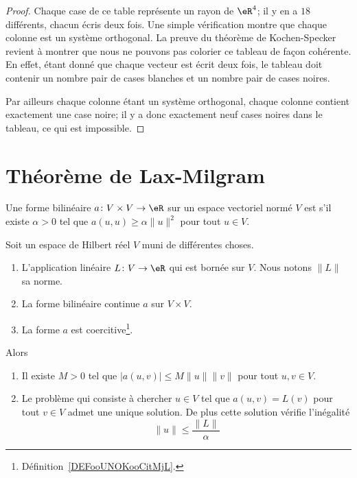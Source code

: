 \begin{proof}
    Chaque case de ce table représente un rayon de \( \eR^4\); il y en a \( 18\) différents, chacun écris deux fois. Une simple vérification montre que chaque colonne est un système orthogonal. La preuve du théorème de Kochen-Specker revient à montrer que nous ne pouvons pas colorier ce tableau de façon cohérente. En effet, étant donné que chaque vecteur est écrit deux fois, le tableau doit contenir un nombre pair de cases blanches et un nombre pair de cases noires.

    Par ailleurs chaque colonne étant un système orthogonal, chaque colonne contient exactement une case noire; il y a donc exactement neuf cases noires dans le tableau, ce qui est impossible.

\end{proof}

\section{Théorème de Lax-Milgram}

\begin{definition}      \label{DEFooUNOKooCitMjL}
    Une forme bilinéaire \( a\colon V\times V\to \eR\) sur un espace vectoriel normé \( V\) est  s'il existe \( \alpha>0\) tel que \(  a(u,u)\geq \alpha\| u \|^2 \) pour tout \( u\in V\).
\end{definition}

\begin{theorem}       \label{THOooLLUXooHyqmVL}
    Soit un espace de Hilbert réel \( V\) muni de différentes choses.
    \begin{enumerate}
        \item
            L'application linéaire \( L\colon V\to \eR\) qui est bornée sur \( V\). Nous notons \( \| L \|\) sa norme.
        \item
            La forme bilinéaire continue \( a\) sur \( V\times V\).
        \item
            La forme \( a\) est coercitive\footnote{Définition~\ref{DEFooUNOKooCitMjL}.}.
    \end{enumerate}
    Alors
    \begin{enumerate}
        \item
            Il existe \( M>0\) tel que \( | a(u,v) |\leq M\| u \|\| v \|\) pour tout \( u,v\in V\).
        \item
            Le problème qui consiste à chercher \( u\in V\) tel que \( a(u,v)=L(v)\) pour tout \( v\in V\) admet une unique solution. De plus cette solution vérifie l'inégalité
    \begin{equation}        \label{EQooUAYSooKYyQBU}
        \| u \|\leq \frac{ \| L \| }{ \alpha }
    \end{equation}
    \end{enumerate}
\end{theorem}

